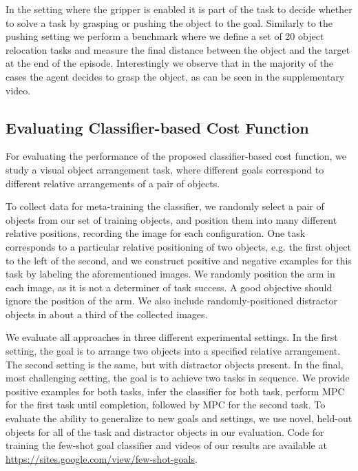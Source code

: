 In the setting where the gripper is enabled it is part of the task to decide whether to solve a task by grasping or pushing the object to the goal. Similarly to the pushing setting we perform a benchmark where we define a set of 20 object relocation tasks and measure the final distance between the object and the target at the end of the episode. Interestingly we observe that in the majority of the cases the agent decides to grasp the object, as can be seen in the supplementary video.


\subsection{Evaluating Classifier-based Cost Function}

For evaluating the performance of the proposed classifier-based cost function, we study a visual object arrangement task, where different goals correspond to different relative arrangements of a pair of objects. 


To collect data for meta-training the classifier, we randomly select a pair of objects from our set of training objects, and position them into many different relative positions, recording the image for each configuration. One task corresponds to a particular relative positioning of two objects, e.g. the first object to the left of the second, and we construct positive and negative examples for this task by labeling the aforementioned images. We randomly position the arm in each image, as it is not a determiner of task success. A good objective should ignore the position of the arm. We also include randomly-positioned distractor objects in about a third of the collected images.

We evaluate all approaches in three different experimental settings. In the first setting, the goal is to arrange two objects into a specified relative arrangement. The second setting is the same, but with distractor objects present. In the final, most challenging setting, the goal is to achieve two tasks in sequence. We provide positive examples for both tasks, infer the classifier for both task, perform MPC for the first task until completion, followed by MPC for the second task. To evaluate the ability to generalize to new goals and settings, we use novel, held-out objects for all of the task and distractor objects in our evaluation. Code for training the few-shot goal classifier and videos of our results are available at \url{https://sites.google.com/view/few-shot-goals}.

